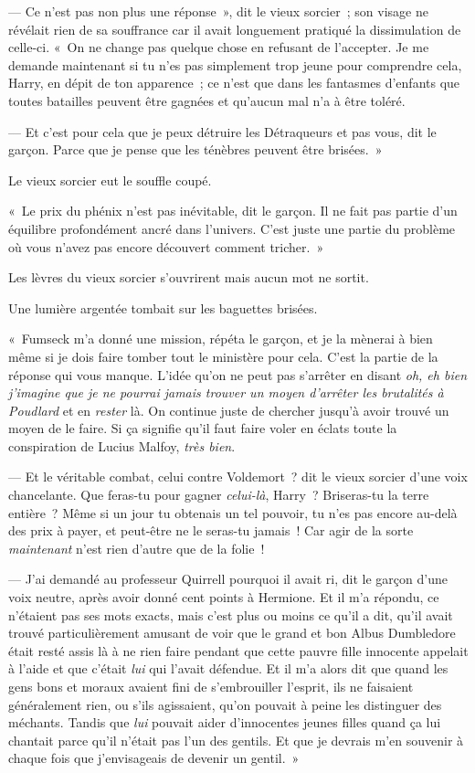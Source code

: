 --- Ce n'est pas non plus une réponse~», dit le vieux sorcier~; son visage ne révélait rien de sa souffrance car il avait longuement pratiqué la dissimulation de celle-ci. «~On ne change pas quelque chose en refusant de l'accepter. Je me demande maintenant si tu n'es pas simplement trop jeune pour comprendre cela, Harry, en dépit de ton apparence~; ce n'est que dans les fantasmes d'enfants que toutes batailles peuvent être gagnées et qu'aucun mal n'a à être toléré.

--- Et c'est pour cela que je peux détruire les Détraqueurs et pas vous, dit le garçon. Parce que je pense que les ténèbres peuvent être brisées.~»

Le vieux sorcier eut le souffle coupé.

«~Le prix du phénix n'est pas inévitable, dit le garçon. Il ne fait pas partie d'un équilibre profondément ancré dans l'univers. C'est juste une partie du problème où vous n'avez pas encore découvert comment tricher.~»

Les lèvres du vieux sorcier s'ouvrirent mais aucun mot ne sortit.

Une lumière argentée tombait sur les baguettes brisées.

«~Fumseck m'a donné une mission, répéta le garçon, et je la mènerai à bien même si je dois faire tomber tout le ministère pour cela. C'est la partie de la réponse qui vous manque. L'idée qu'on ne peut pas s'arrêter en disant \emph{oh, eh bien j'imagine que je ne pourrai jamais trouver un moyen d'arrêter les brutalités à Poudlard} et en \emph{rester} là. On continue juste de chercher jusqu'à avoir trouvé un moyen de le faire. Si ça signifie qu'il faut faire voler en éclats toute la conspiration de Lucius Malfoy, \emph{très bien}.

--- Et le véritable combat, celui contre Voldemort~? dit le vieux sorcier d'une voix chancelante. Que feras-tu pour gagner \emph{celui-là}, Harry~? Briseras-tu la terre entière~? Même si un jour tu obtenais un tel pouvoir, tu n'es pas encore au-delà des prix à payer, et peut-être ne le seras-tu jamais~! Car agir de la sorte \emph{maintenant} n'est rien d'autre que de la folie~!

--- J'ai demandé au professeur Quirrell pourquoi il avait ri, dit le garçon d'une voix neutre, après avoir donné cent points à Hermione. Et il m'a répondu, ce n'étaient pas ses mots exacts, mais c'est plus ou moins ce qu'il a dit, qu'il avait trouvé particulièrement amusant de voir que le grand et bon Albus Dumbledore était resté assis là à ne rien faire pendant que cette pauvre fille innocente appelait à l'aide et que c'était \emph{lui} qui l'avait défendue. Et il m'a alors dit que quand les gens bons et moraux avaient fini de s'embrouiller l'esprit, ils ne faisaient généralement rien, ou s'ils agissaient, qu'on pouvait à peine les distinguer des méchants. Tandis que \emph{lui} pouvait aider d'innocentes jeunes filles quand ça lui chantait parce qu'il n'était pas l'un des gentils. Et que je devrais m'en souvenir à chaque fois que j'envisageais de devenir un gentil.~»

